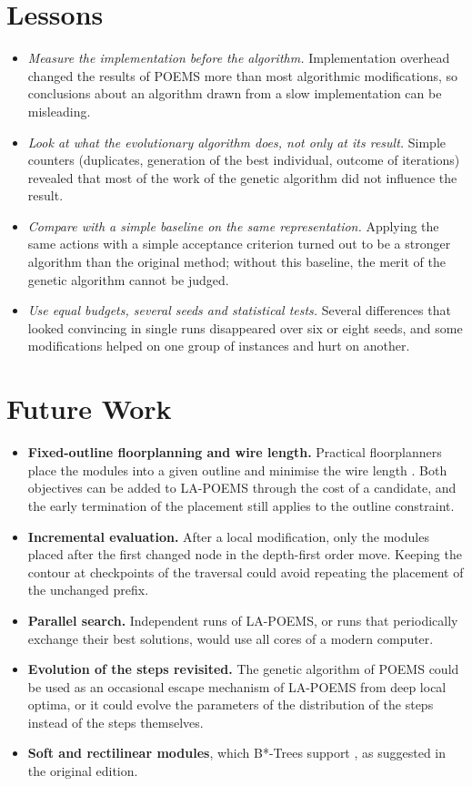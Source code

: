 \section{Lessons}

\begin{itemize}
\item {\em Measure the implementation before the algorithm.} Implementation overhead changed the results of POEMS more than most algorithmic modifications, so conclusions about an algorithm drawn from a slow implementation can be misleading.
\item {\em Look at what the evolutionary algorithm does, not only at its result.} Simple counters (duplicates, generation of the best individual, outcome of iterations) revealed that most of the work of the genetic algorithm did not influence the result.
\item {\em Compare with a simple baseline on the same representation.} Applying the same actions with a simple acceptance criterion turned out to be a stronger algorithm than the original method; without this baseline, the merit of the genetic algorithm cannot be judged.
\item {\em Use equal budgets, several seeds and statistical tests.} Several differences that looked convincing in single runs disappeared over six or eight seeds, and some modifications helped on one group of instances and hurt on another.
\end{itemize}

\section{Future Work}

\begin{itemize}
\item {\bf Fixed-outline floorplanning and wire length.} Practical floorplanners place the modules into a given outline and minimise the wire length \cite{adya,btreesa}. Both objectives can be added to LA-POEMS through the cost of a candidate, and the early termination of the placement still applies to the outline constraint.
\item {\bf Incremental evaluation.} After a local modification, only the modules placed after the first changed node in the depth-first order move. Keeping the contour at checkpoints of the traversal could avoid repeating the placement of the unchanged prefix.
\item {\bf Parallel search.} Independent runs of LA-POEMS, or runs that periodically exchange their best solutions, would use all cores of a modern computer.
\item {\bf Evolution of the steps revisited.} The genetic algorithm of POEMS could be used as an occasional escape mechanism of LA-POEMS from deep local optima, or it could evolve the parameters of the distribution of the steps instead of the steps themselves.
\item {\bf Soft and rectilinear modules}, which B*-Trees support \cite{btree}, as suggested in the original edition.
\end{itemize}

